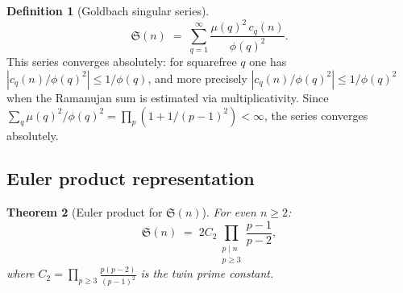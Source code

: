 \documentclass[12pt,a4paper]{amsart}
\newtheorem{theorem}{Theorem}[section]
\theoremstyle{definition}
\newtheorem{definition}[theorem]{Definition}
\begin{document}
\begin{definition}[Goldbach singular series]\label{def:Goldbach_sing}
  \[
    \mathfrak{S}(n)
    \;=\; \sum_{q=1}^{\infty} \frac{\mu(q)^2\, c_q(n)}{\phi(q)^2}.
  \]
  This series converges absolutely: for squarefree $q$ one has
  $|c_q(n)/\phi(q)^2| \leq 1/\phi(q)$, and more precisely
  $|c_q(n)/\phi(q)^2| \leq 1/\phi(q)^2$ when the Ramanujan sum is
  estimated via multiplicativity.  Since
  $\sum_q \mu(q)^2/\phi(q)^2 = \prod_p (1 + 1/(p-1)^2) < \infty$,
  the series converges absolutely.
\end{definition}

\subsection{Euler product representation}

\begin{theorem}[Euler product for $\mathfrak{S}(n)$]\label{thm:euler}
  For even $n \geq 2$:
  \[
    \mathfrak{S}(n)
    \;=\; 2 C_2 \prod_{\substack{p \mid n \\ p \geq 3}} \frac{p-1}{p-2},
  \]
  where $C_2 = \prod_{p \geq 3} \frac{p(p-2)}{(p-1)^2}$ is the
  twin prime constant.
\end{theorem}
\end{document}
